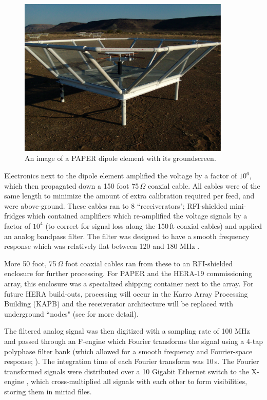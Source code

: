 \begin{figure}
\centering
\includegraphics[width=0.9\textwidth]{chapters/instruments/figures/PAPER_dipole.pdf}
\caption{An image of a PAPER dipole element with its groundscreen.}
\label{fig:instruments_PAPER_element}
\end{figure}


Electronics next to the dipole element amplified the voltage by a factor of $10^6$, which then propagated down a 150 foot 75\,$\Omega$ coaxial cable. All cables were of the same length to minimize the amount of extra calibration required per feed, and were above-ground. These cables ran to 8 ``receiverators"; RFI-shielded mini-fridges which contained amplifiers which re-amplified the voltage signals by a factor of $10^4$  (to correct for signal loss along the 150\,ft coaxial cables) and applied an analog bandpass filter. The filter was designed to have a smooth frequency response which was relatively flat between 120 and 180 MHz \citep[e.g.][]{MooreThesis}.

More 50 foot, 75\,$\Omega$ foot coaxial cables ran from these to an RFI-shielded enclosure for further processing. For PAPER and the HERA-19 commissioning array, this enclosure was a specialized shipping container next to the array. For future HERA build-outs, processing will occur in the Karro Array Processing Building (KAPB) and the receiverator architecture will be replaced with underground ``nodes" (see \citet{deBoer.17} for more detail).

The filtered analog signal was then digitized with a sampling rate of 100 MHz and passed through an F-engine which Fourier transforms the signal using a 4-tap polyphase filter bank (which allowed for a smooth frequency and Fourier-space response; \citet{PricePFB}). The integration time of each Fourier transform was 10\,s. The Fourier transformed signals were distributed over a 10 Gigabit Ethernet switch to the X-engine \citep{Parsons.08}, which cross-multiplied all signals with each other to form visibilities, storing them in {\sc miriad} files.

